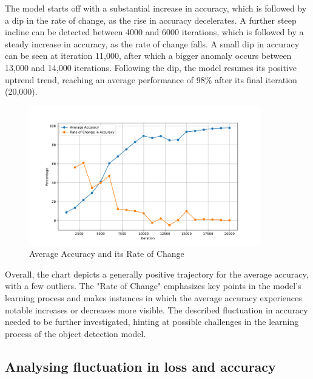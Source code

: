 The model starts off with a substantial increase in accuracy, which is followed by a dip in the rate of change, as the rise in accuracy 
decelerates. A further steep incline can be detected between 4000 and 6000 iterations, which is followed by a steady increase in accuracy, as
the rate of change falls. A small dip in accuracy can be seen at iteration 11,000, after which a bigger anomaly occurs between 13,000
and 14,000 iterations. Following the dip, the model resumes its positive uptrend trend, reaching an average performance of 98\% after its final
iteration (20,000).

\newpage

\begin{figure}[h]
   \centering
   \includegraphics[width=0.9\textwidth]{../Data/accuracy-improvement-graph.png}
   \caption{Average Accuracy and its Rate of Change}
   \label{fig:accuracy-improvement}
\end{figure}

Overall, the chart depicts a generally positive trajectory for the average accuracy, with a few outliers. The "Rate of Change" emphasizes
key points in the model's learning process and makes instances in which the average accuracy experiences notable increases or decreases more
visible. The described fluctuation in accuracy needed to be further investigated, hinting at possible
challenges in the learning process of the object detection model. \\

\subsection{Analysing fluctuation in loss and accuracy}

